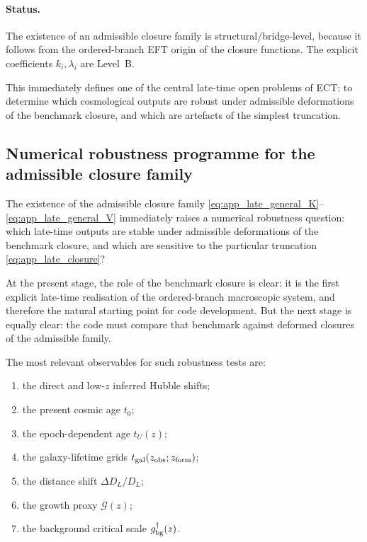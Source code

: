 \documentclass[11pt,a4paper]{article}
\numberwithin{equation}{section}
\begin{document}
\paragraph{Status.}
The existence of an admissible closure family is structural/bridge-level,
because it follows from the ordered-branch EFT origin of the closure
functions.
The explicit coefficients $k_i,\lambda_i$ are Level~B.

This immediately defines one of the central late-time open problems of
ECT: to determine which cosmological outputs are robust under
admissible deformations of the benchmark closure, and which are artefacts
of the simplest truncation.

\subsection{Numerical robustness programme for the admissible closure family}
\label{sec:late_closure_robustness}

The existence of the admissible closure family
\eqref{eq:app_late_general_K}--\eqref{eq:app_late_general_V}
immediately raises a numerical robustness question:
which late-time outputs are stable under admissible deformations of the
benchmark closure, and which are sensitive to the particular truncation
\eqref{eq:app_late_closure}?

At the present stage, the role of the benchmark closure is clear:
it is the first explicit late-time realisation of the ordered-branch
macroscopic system, and therefore the natural starting point for code
development.
But the next stage is equally clear:
the code must compare that benchmark against deformed closures of the
admissible family.

The most relevant observables for such robustness tests are:
\begin{enumerate}
  \item the direct and low-$z$ inferred Hubble shifts;
  \item the present cosmic age $t_0$;
  \item the epoch-dependent age $t_U(z)$;
  \item the galaxy-lifetime grids
  $t_{\rm gal}(z_{\rm obs};z_{\rm form})$;
  \item the distance shift $\Delta D_L/D_L$;
  \item the growth proxy $\mathcal{G}(z)$;
  \item the background critical scale
  $g^\dagger_{\rm bg}(z)$.
\end{enumerate}
\end{document}
